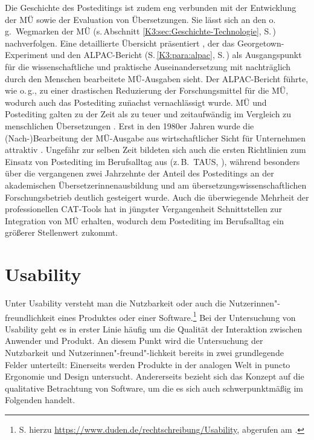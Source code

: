 Die Geschichte des Posteditings ist zudem eng verbunden mit der Entwicklung der MÜ sowie der Evaluation von Übersetzungen. Sie lässt sich an den o.\,g.\ Wegmarken der MÜ (s.\,Abschnitt \ref{K3:sec:Geschichte-Technologie}, S.\,\pageref{K3:sec:Geschichte-Technologie}) nachverfolgen. Eine detaillierte Übersicht präsentiert \citet[293]{garcia_brief_2012}, der das Georgetown-Experiment und den ALPAC-Bericht (S.\,\ref{K3:para:alpac}, S.\,\pageref{K3:para:alpac}) als Ausgangspunkt für die wissenschaftliche und praktische Auseinandersetzung mit nachträglich durch den Menschen bearbeitete MÜ-Ausgaben sieht. Der ALPAC-Bericht führte, wie o.\,g., zu einer drastischen Reduzierung der Forschungsmittel für die MÜ, wodurch auch das Postediting zu\"nachst vernachlässigt wurde. MÜ und Postediting galten zu der Zeit als zu teuer und zeitaufwändig im Vergleich zu menschlichen Übersetzungen \citep[295]{garcia_brief_2012}. Erst in den 1980er Jahren wurde die (Nach-)Bearbeitung der MÜ-Ausgabe aus wirtschaftlicher Sicht für Unternehmen attraktiv \citep[297]{garcia_brief_2012}. Ungefähr zur selben Zeit bildeten sich auch die ersten Richtlinien zum Einsatz von Postediting im Berufsalltag aus (z.\,B.\ TAUS, \cite[]{massardo_mt_2016}), während besonders über die vergangenen zwei Jahrzehnte der Anteil des Posteditings an der akademischen Übersetzer{\textperiodcentered}innenausbildung und am übersetzungswissenschaftlichen Forschungsbetrieb deutlich gesteigert wurde. Auch die überwiegende Mehrheit der professionellen CAT-Tools hat in jüngster Vergangenheit Schnittstellen zur Integration von MÜ erhalten, wodurch dem Postediting im Berufsalltag ein größerer Stellenwert zukommt.



\section{Usability}
\label{K3:sec:Usability}


Unter Usability versteht man die Nutzbarkeit oder auch die Nutzer{\textperiodcentered}innen"-freundlichkeit eines Produktes oder einer Software.\footnote{S. hierzu \url{https://www.duden.de/rechtschreibung/Usability}, abgerufen am \datum{}.} Bei der Untersuchung von Usability geht es in erster Linie häufig um die Qualität der Interaktion zwischen Anwender und Produkt. An diesem Punkt wird die Untersuchung der Nutzbarkeit und Nutzer{\textperiodcentered}innen"-freund"-lichkeit bereits in zwei grundlegende Felder unterteilt: Einerseits werden Produkte in der analogen Welt in puncto Ergonomie und Design untersucht. Andererseits bezieht sich das Konzept auf die qualitative Betrachtung von Software, um die es sich auch schwerpunktmäßig im Folgenden handelt.

